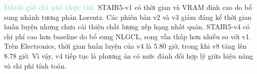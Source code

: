 \noindent\textcolor{lightblue}{\textbf{Đánh giá chi phí thực thi.}} STAIR5-v1 có thời gian và VRAM đỉnh cao do bổ sung nhánh tương phản Lorentz. Các phiên bản v2 và v3 giảm đáng kể thời gian huấn luyện nhưng chưa cải thiện chất lượng xếp hạng nhất quán. STAIR5-v4 có chi phí cao hơn baseline do bổ sung NLGCL, song vẫn thấp hơn nhiều so với v1. Trên Electronics, thời gian huấn luyện của v4 là 5.80 giờ, trong khi v8 tăng lên 8.78 giờ. Vì vậy, v4 tiếp tục là phương án có mức đánh đổi hợp lý giữa hiệu năng và chi phí tính toán.

\clearpage